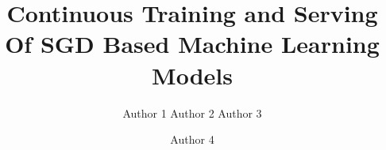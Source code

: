 \documentclass{sig-alternate-05-2015}
\begin{document}






%

\title{Continuous Training and Serving Of SGD Based Machine Learning Models}

%
%
%
%
%

%
\author{
%
%
\alignauthor
Author 1
\alignauthor
Author 2
\alignauthor Author 3
\and  %
\alignauthor Author 4
}
\end{document}
